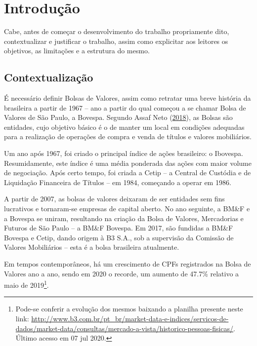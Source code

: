 \documentclass[grad,numbers]{coppe}
\begin{document}
  \listoffigures

  \listoftables

  \printlosymbols
  \printloabbreviations

  \mainmatter

  \hypertarget{introduuxe7uxe3o}{%
  \chapter{Introdução}\label{introduuxe7uxe3o}}

  Cabe, antes de começar o desenvolvimento do trabalho propriamente dito, contextualizar e justificar o trabalho, assim como explicitar aos leitores os objetivos, as limitações e a estrutura do mesmo.

  \hypertarget{contextualizauxe7uxe3o}{%
  \section{Contextualização}\label{contextualizauxe7uxe3o}}

  É necessário definir Bolsas de Valores, assim como retratar uma breve história da brasileira a partir de 1967 -- ano a partir do qual começou a se chamar Bolsa de Valores de São Paulo, a Bovespa. Segundo Assaf Neto (\protect\hyperlink{ref-assafneto2018}{2018}), as Bolsas são entidades, cujo objetivo básico é o de manter um local em condições adequadas para a realização de operações de compra e venda de títulos e valores mobiliários.

  Um ano após 1967, foi criado o principal índice de ações brasileiro: o Ibovespa. Resumidamente, este índice é uma média ponderada das ações com maior volume de negociação. Após certo tempo, foi criada a Cetip -- a Central de Custódia e de Liquidação Financeira de Títulos -- em 1984, começando a operar em 1986.

  A partir de 2007, as bolsas de valores deixaram de ser entidades sem fins lucrativos e tornaram-se empresas de capital aberto. No ano seguinte, a BM\&F e a Bovespa se uniram, resultando na criação da Bolsa de Valores, Mercadorias e Futuros de São Paulo -- a BM\&F Bovespa. Em 2017, são fundidas a BM\&F Bovespa e Cetip, dando origem à B3 S.A., sob a supervisão da Comissão de Valores Mobiliários -- esta é a bolsa brasileira atualmente.

  Em tempos contemporâneos, há um crescimento de CPFs registrados na Bolsa de Valores ano a ano, sendo em 2020 o recorde, um aumento de 47.7\% relativo a maio de 2019\footnote{Pode-se conferir a evolução dos mesmos baixando a planilha presente neste link: \url{http://www.b3.com.br/pt_br/market-data-e-indices/servicos-de-dados/market-data/consultas/mercado-a-vista/historico-pessoas-fisicas/}. Último acesso em 07 jul 2020.}.
\end{document}
